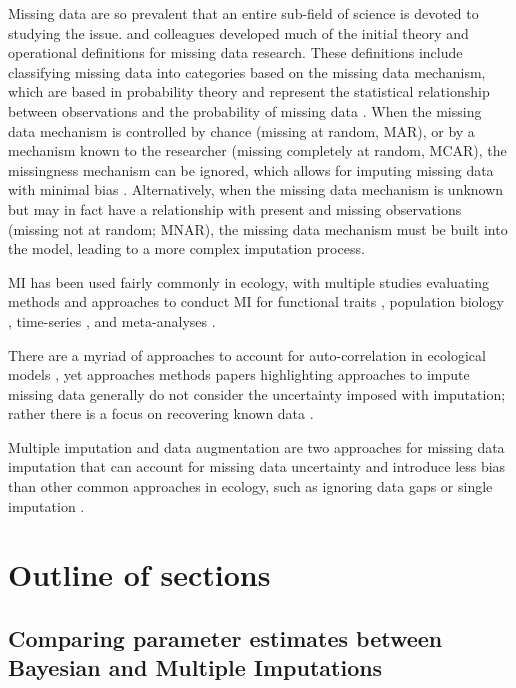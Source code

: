 Missing data are so prevalent that an entire sub-field of science is devoted to studying the issue. \cite{rubin_inference_1976} and colleagues developed much of the initial theory and operational definitions for missing data research. These definitions include classifying missing data into categories based on the missing data mechanism, which are based in probability theory and represent the statistical relationship between observations and the probability of missing data \citep{rubin_inference_1976}. When the missing data mechanism is controlled by chance (missing at random, MAR), or by a mechanism known to the researcher (missing completely at random, MCAR), the missingness mechanism can be ignored, which allows for imputing missing data with minimal bias \citep{little_statistical_2002, nakagawa_missing_2015}. Alternatively, when the missing data mechanism is unknown but may in fact have a relationship with present and missing observations (missing not at random; MNAR), the missing data mechanism must be built into the model, leading to a more complex imputation process. 


 MI has been used fairly commonly in ecology, with multiple studies evaluating methods and approaches to conduct MI for functional traits \citep{taugourdeau_filling_2014,johnson_handling_2021,penone_imputation_2014}, population biology \citep{onkelinx_working_2017}, time-series \citep{hui_gap-filling_2004}, and meta-analyses \citep{ellington_using_2015}. 


There are a myriad of approaches to account for auto-correlation in ecological models \cite{hefley_basis_2017, borcard_partialling_1992, padilla_space-time_2020}, yet approaches methods papers highlighting approaches to impute missing data generally do not consider the uncertainty imposed with imputation; rather there is a focus on recovering known data \cite{penone_imputation_2014, johnson_handling_2021, ellington_using_2015}.



Multiple imputation and data augmentation are two approaches for missing data imputation that can account for missing data uncertainty and introduce less bias than other common approaches in ecology, such as ignoring data gaps or single imputation \citep{nakagawa_missing_2008, graham_missing_2009}.

\section*{Outline of sections}
\subsection*{Comparing parameter estimates between Bayesian and Multiple Imputations}

